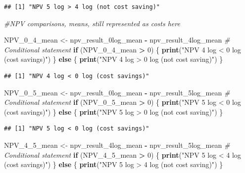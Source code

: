 \documentclass[
]{article}
\newenvironment{Shaded}{\begin{snugshade}}{\end{snugshade}}
\newcommand{\CommentTok}[1]{\textcolor[rgb]{0.56,0.35,0.01}{\textit{#1}}}
\newcommand{\ControlFlowTok}[1]{\textcolor[rgb]{0.13,0.29,0.53}{\textbf{#1}}}
\newcommand{\DecValTok}[1]{\textcolor[rgb]{0.00,0.00,0.81}{#1}}
\newcommand{\FunctionTok}[1]{\textcolor[rgb]{0.13,0.29,0.53}{\textbf{#1}}}
\newcommand{\NormalTok}[1]{#1}
\newcommand{\OtherTok}[1]{\textcolor[rgb]{0.56,0.35,0.01}{#1}}
\newcommand{\SpecialCharTok}[1]{\textcolor[rgb]{0.81,0.36,0.00}{\textbf{#1}}}
\newcommand{\StringTok}[1]{\textcolor[rgb]{0.31,0.60,0.02}{#1}}
\begin{document}
\begin{verbatim}
## [1] "NPV 5 log > 4 log (not cost saving)"
\end{verbatim}

\begin{Shaded}
\begin{Highlighting}[]
\CommentTok{\#NPV comparisons, means, still represented as costs here}

\NormalTok{NPV\_0\_4\_mean }\OtherTok{\textless{}{-}}\NormalTok{ npv\_result\_0log\_mean }\SpecialCharTok{{-}}\NormalTok{ npv\_result\_4log\_mean}
\CommentTok{\# Conditional statement}
\ControlFlowTok{if}\NormalTok{ (NPV\_0\_4\_mean }\SpecialCharTok{\textgreater{}} \DecValTok{0}\NormalTok{) \{}
  \FunctionTok{print}\NormalTok{(}\StringTok{"NPV 4 log \textless{} 0 log (cost savings)"}\NormalTok{)}
\NormalTok{\} }\ControlFlowTok{else}\NormalTok{ \{}
  \FunctionTok{print}\NormalTok{(}\StringTok{"NPV 4 log \textgreater{} 0 log (not cost saving)"}\NormalTok{)}
\NormalTok{\}}
\end{Highlighting}
\end{Shaded}

\begin{verbatim}
## [1] "NPV 4 log < 0 log (cost savings)"
\end{verbatim}

\begin{Shaded}
\begin{Highlighting}[]
\NormalTok{NPV\_0\_5\_mean }\OtherTok{\textless{}{-}}\NormalTok{ npv\_result\_0log\_mean }\SpecialCharTok{{-}}\NormalTok{ npv\_result\_5log\_mean}
\CommentTok{\# Conditional statement}
\ControlFlowTok{if}\NormalTok{ (NPV\_0\_5\_mean }\SpecialCharTok{\textgreater{}} \DecValTok{0}\NormalTok{) \{}
  \FunctionTok{print}\NormalTok{(}\StringTok{"NPV 5 log \textless{} 0 log (cost savings)"}\NormalTok{)}
\NormalTok{\} }\ControlFlowTok{else}\NormalTok{ \{}
  \FunctionTok{print}\NormalTok{(}\StringTok{"NPV 5 log \textgreater{} 0 log (not cost saving)"}\NormalTok{)}
\NormalTok{\}}
\end{Highlighting}
\end{Shaded}

\begin{verbatim}
## [1] "NPV 5 log < 0 log (cost savings)"
\end{verbatim}

\begin{Shaded}
\begin{Highlighting}[]
\NormalTok{NPV\_4\_5\_mean }\OtherTok{\textless{}{-}}\NormalTok{ npv\_result\_4log\_mean }\SpecialCharTok{{-}}\NormalTok{ npv\_result\_5log\_mean}
\CommentTok{\# Conditional statement}
\ControlFlowTok{if}\NormalTok{ (NPV\_4\_5\_mean }\SpecialCharTok{\textgreater{}} \DecValTok{0}\NormalTok{) \{}
  \FunctionTok{print}\NormalTok{(}\StringTok{"NPV 5 log \textless{} 4 log (cost savings)"}\NormalTok{)}
\NormalTok{\} }\ControlFlowTok{else}\NormalTok{ \{}
   \FunctionTok{print}\NormalTok{(}\StringTok{"NPV 5 log \textgreater{} 4 log (not cost saving)"}\NormalTok{)}
\NormalTok{\}}
\end{Highlighting}
\end{Shaded}
\end{document}
